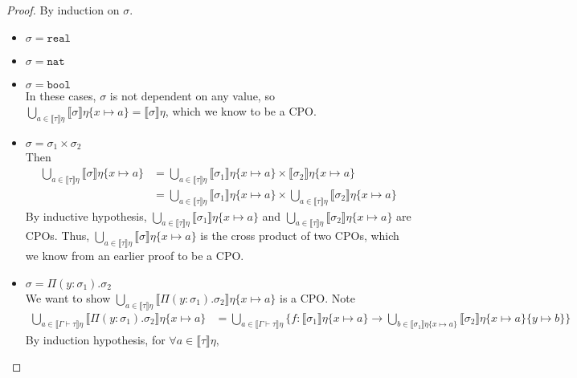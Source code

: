 \begin{proof}
By induction on $\sigma$.
\begin{itemize}
\item $\sigma = \texttt{real}$ 
\item $\sigma = \texttt{nat}$ 
\item $\sigma = \texttt{bool}$ \\
In these cases, $\sigma$ is not dependent on any value, so 
$\bigcup_{a \in \llbracket \tau \rrbracket\eta}\llbracket\sigma\rrbracket\eta\{x\mapsto a\} = \llbracket \sigma \rrbracket\eta$,
which we know to be a CPO.
\item $\sigma = \sigma_1 \times \sigma_2$ \\
Then 
\begin{align*}
\bigcup_{a \in \llbracket \tau \rrbracket\eta}
\llbracket \sigma \rrbracket\eta\{x\mapsto a\} &= 
\bigcup_{a \in \llbracket \tau \rrbracket\eta} \llbracket \sigma_1 \rrbracket\eta\{x\mapsto a\} 
\times \llbracket \sigma_2 \rrbracket\eta\{x\mapsto a\} \\
&= \bigcup_{a \in \llbracket \tau \rrbracket\eta} \llbracket \sigma_1 \rrbracket\eta\{x\mapsto a\} 
\times \bigcup_{a \in \llbracket \tau \rrbracket\eta} \llbracket \sigma_2 \rrbracket\eta\{x\mapsto a\}  
\end{align*}
By inductive hypothesis, $\bigcup_{a \in \llbracket \tau \rrbracket\eta} \llbracket \sigma_1 \rrbracket\eta\{x\mapsto a\} $
and $ \bigcup_{a \in \llbracket \tau \rrbracket\eta} \llbracket \sigma_2 \rrbracket\eta\{x\mapsto a\}$ are CPOs. Thus,
$\bigcup_{a \in \llbracket \tau \rrbracket\eta}\llbracket \sigma \rrbracket\eta\{x\mapsto a\}$ is the cross product of two 
CPOs, which we know from an earlier proof to be a CPO.
\item $\sigma = \Pi(y: \sigma_1).\sigma_2$ \\
We want to show $\bigcup_{a \in \llbracket \tau \rrbracket\eta} 
\llbracket \Pi(y: \sigma_1).\sigma_2\rrbracket\eta\{x \mapsto a\}$ is a CPO. Note
\begin{align*}
\bigcup_{a \in \llbracket \Gamma \vdash \tau \rrbracket\eta} 
\llbracket \Pi(y: \sigma_1).\sigma_2\rrbracket\eta\{x \mapsto a\}
&= \bigcup_{a \in \llbracket \Gamma \vdash \tau \rrbracket\eta} \{ f : \llbracket \sigma_1 \rrbracket\eta\{x\mapsto a\}
\rightarrow \bigcup_{b \in \llbracket \sigma_1 \rrbracket\eta\{x\mapsto a\}} \llbracket \sigma_2\rrbracket\eta
\{x\mapsto a\}\{y\mapsto b\}\}
\end{align*} 
By induction hypothesis, for $\forall a \in \llbracket \tau \rrbracket\eta,$

\end{itemize}
\end{proof}
